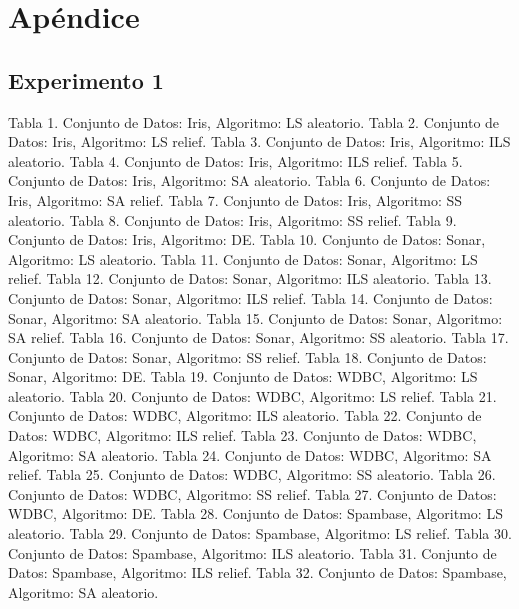 \documentclass{ci5652}
\begin{document}

\newpage
\section*{Apéndice}

\subsection*{Experimento 1}

Tabla 1. Conjunto de Datos: Iris, Algoritmo: LS aleatorio.
Tabla 2. Conjunto de Datos: Iris, Algoritmo: LS relief.
Tabla 3. Conjunto de Datos: Iris, Algoritmo: ILS aleatorio.
Tabla 4. Conjunto de Datos: Iris, Algoritmo: ILS relief.
Tabla 5. Conjunto de Datos: Iris, Algoritmo: SA aleatorio.
Tabla 6. Conjunto de Datos: Iris, Algoritmo: SA relief.
Tabla 7. Conjunto de Datos: Iris, Algoritmo: SS aleatorio.
Tabla 8. Conjunto de Datos: Iris, Algoritmo: SS relief.
Tabla 9. Conjunto de Datos: Iris, Algoritmo: DE. 
Tabla 10. Conjunto de Datos: Sonar, Algoritmo: LS aleatorio.
Tabla 11. Conjunto de Datos: Sonar, Algoritmo: LS relief.
Tabla 12. Conjunto de Datos: Sonar, Algoritmo: ILS aleatorio.
Tabla 13. Conjunto de Datos: Sonar, Algoritmo: ILS relief.
Tabla 14. Conjunto de Datos: Sonar, Algoritmo: SA aleatorio.
Tabla 15. Conjunto de Datos: Sonar, Algoritmo: SA relief.
Tabla 16. Conjunto de Datos: Sonar, Algoritmo: SS aleatorio.
Tabla 17. Conjunto de Datos: Sonar, Algoritmo: SS relief.
Tabla 18. Conjunto de Datos: Sonar, Algoritmo: DE.
Tabla 19. Conjunto de Datos: WDBC, Algoritmo: LS aleatorio.
Tabla 20. Conjunto de Datos: WDBC, Algoritmo: LS relief.
Tabla 21. Conjunto de Datos: WDBC, Algoritmo: ILS aleatorio.
Tabla 22. Conjunto de Datos: WDBC, Algoritmo: ILS relief.
Tabla 23. Conjunto de Datos: WDBC, Algoritmo: SA aleatorio.
Tabla 24. Conjunto de Datos: WDBC, Algoritmo: SA relief.
Tabla 25. Conjunto de Datos: WDBC, Algoritmo: SS aleatorio.
Tabla 26. Conjunto de Datos: WDBC, Algoritmo: SS relief.
Tabla 27. Conjunto de Datos: WDBC, Algoritmo: DE.
Tabla 28. Conjunto de Datos: Spambase, Algoritmo: LS aleatorio.
Tabla 29. Conjunto de Datos: Spambase, Algoritmo: LS relief.
Tabla 30. Conjunto de Datos: Spambase, Algoritmo: ILS aleatorio.
Tabla 31. Conjunto de Datos: Spambase, Algoritmo: ILS relief.
Tabla 32. Conjunto de Datos: Spambase, Algoritmo: SA aleatorio.
\end{document}
